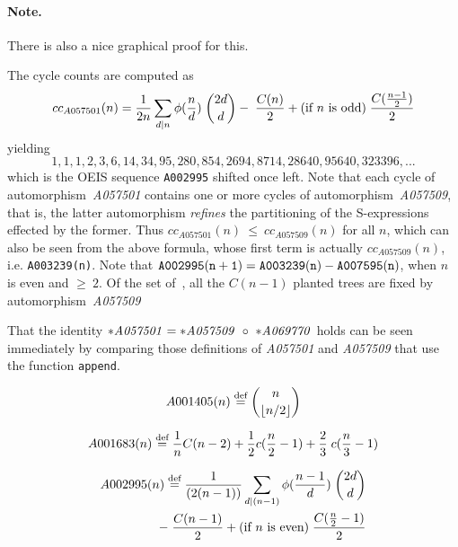\documentclass[11pt]{article} %
\newcommand{\eeq}{\end{equation}}
\newcommand{\beql}[1]{\begin{equation}\label{#1}}
\def\defequ{\;{\buildrel\text{\rm def}\over=}\;}
\def\sratio#1#2{{#1/#2}}
\def\oratio#1#2{{#1\over #2}}
\newcommand{\autname}[1]{{\it *#1}}
\newcommand{\automorphism}[1]{automorphism~\autname{#1}}
\newcommand{\EISseq}[1]{{\tt #1}}
\newcommand{\scmsym}[1]{{\tt{#1}}}
\begin{document}
\paragraph{Note.} There is also a nice graphical proof for this.

The cycle counts are computed as
\beql{Eqcc_A057501}
\aligned
cc_{A057501}(n) =
 \oratio{1}{2n} \sum_{d|n}\phi(\oratio{n}{d})\;{2d\choose d}
-\;\oratio{C(n)}{2} + \text{\rm(if $n$ is odd)}\;\oratio{C(\oratio{n-1}{2})}{2}
\endaligned
\eeq
yielding
$$
1,1,1,2,3,6,14,34,95,280,854,2694,8714,28640,95640,323396,...
$$
which is the OEIS sequence \EISseq{A002995} shifted once left.
Note that each cycle of \automorphism{A057501}
contains one or more cycles of \automorphism{A057509},
that is, the latter
automorphism {\em refines} the partitioning of the S-expressions
effected by the former. Thus $cc_{A057501}(n)~{\le}~cc_{A057509}(n)$
for all $n$, which can also be seen from the above formula, whose first term
is actually $cc_{A057509}(n)$, i.e. \EISseq{A003239(n)}.
Note that $\EISseq{A002995(n+1)} = \EISseq{A003239(n)}-\EISseq{A007595(n)}$,
when $n$ is even and $\ge~2$.
Of the set of~{\CatsetN}, all the $C(n-1)$ planted trees are fixed by
\automorphism{A057509}


That the identity $\autname{A057501} = \autname{A057509}~\circ~\autname{A069770}$
holds can be seen immediately by comparing those definitions of
\autname{A057501} and \autname{A057509} that use the function \scmsym{append}.








\thickspace


\beql{EqA001405}
\aligned
 A001405(n) \defequ {n\choose \lfloor \sratio{n}{2}\rfloor}
\endaligned
\eeq

\beql{EqA001683}
\aligned
  A001683(n) \defequ \oratio{1}{n}C(n-2) + \oratio{1}{2}c(\oratio{n}{2}-1) + \oratio{2}{3}\;c(\oratio{n}{3}-1)
\endaligned
\eeq

\beql{EqA002995}
\aligned
  A002995(n) \defequ \oratio{1}{(2(n-1))} \sum_{d|(n-1)}\phi(\oratio{n-1}{d})\;{2d\choose d}
\cr -\;\oratio{C(n-1)}{2} + \text{\rm(if $n$ is even)}\;\oratio{C(\oratio{n}{2}-1)}{2}
\endaligned
\eeq
\end{document}
